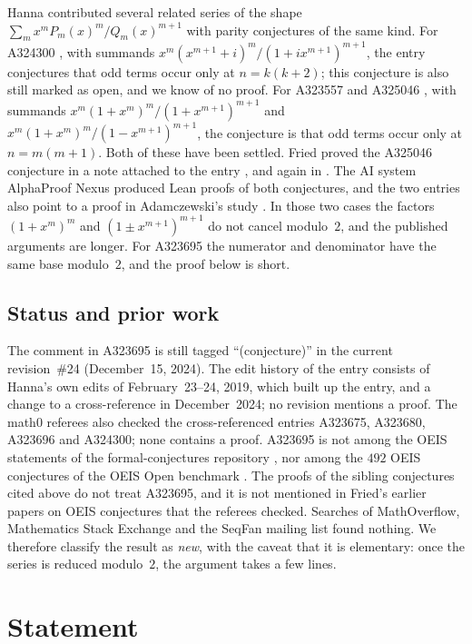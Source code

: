 \documentclass[11pt]{amsart}
\theoremstyle{plain}
\theoremstyle{definition}
\begin{document}
Hanna contributed several related series of the shape $\sum_m x^m P_m(x)^m/Q_m(x)^{m+1}$ with parity conjectures of the same kind. For A324300 \cite{A324300}, with summands $x^m(x^{m+1}+i)^m/(1+ix^{m+1})^{m+1}$, the entry conjectures that odd terms occur only at $n=k(k+2)$; this conjecture is also still marked as open, and we know of no proof. For A323557 and A325046 \cite{A323557,A325046}, with summands $x^m(1+x^m)^m/(1+x^{m+1})^{m+1}$ and $x^m(1+x^m)^m/(1-x^{m+1})^{m+1}$, the conjecture is that odd terms occur only at $n=m(m+1)$. Both of these have been settled. Fried proved the A325046 conjecture in a note attached to the entry \cite{FriedNote}, and again in \cite[pp.~50--51]{Fried}. The AI system AlphaProof Nexus \cite{APN} produced Lean proofs of both conjectures, and the two entries also point to a proof in Adamczewski's study \cite{Ad}. In those two cases the factors $(1+x^m)^m$ and $(1\pm x^{m+1})^{m+1}$ do not cancel modulo~$2$, and the published arguments are longer. For A323695 the numerator and denominator have the same base modulo~$2$, and the proof below is short.

\subsection*{Status and prior work}
The comment in A323695 is still tagged ``(conjecture)'' in the current revision~\#24 (December~15, 2024). The edit history of the entry consists of Hanna's own edits of February~23--24, 2019, which built up the entry, and a change to a cross-reference in December~2024; no revision mentions a proof. The math0 referees also checked the cross-referenced entries A323675, A323680, A323696 and A324300; none contains a proof. A323695 is not among the OEIS statements of the formal-conjectures repository \cite{FC}, nor among the $492$ OEIS conjectures of the OEIS Open benchmark \cite{Ad}. The proofs of the sibling conjectures cited above \cite{FriedNote,Fried,APN,Ad} do not treat A323695, and it is not mentioned in Fried's earlier papers on OEIS conjectures that the referees checked. Searches of MathOverflow, Mathematics Stack Exchange and the SeqFan mailing list found nothing. We therefore classify the result as \emph{new}, with the caveat that it is elementary: once the series is reduced modulo~$2$, the argument takes a few lines.

\section{Statement}\label{sec:statement}
\end{document}
